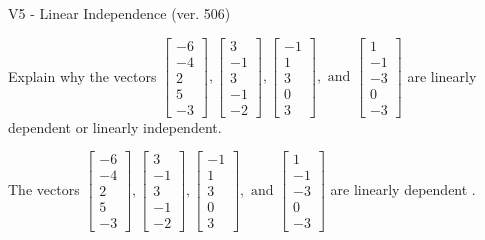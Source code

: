 \begin{exercise}
  \begin{exerciseTitle}V5 - Linear Independence (ver. 506)\end{exerciseTitle}
  \begin{exerciseStatement}
    Explain why the vectors \(\left[\begin{array}{r}
-6 \\
-4 \\
2 \\
5 \\
-3
\end{array}\right] , \left[\begin{array}{r}
3 \\
-1 \\
3 \\
-1 \\
-2
\end{array}\right] , \left[\begin{array}{r}
-1 \\
1 \\
3 \\
0 \\
3
\end{array}\right] , \text{ and } \left[\begin{array}{r}
1 \\
-1 \\
-3 \\
0 \\
-3
\end{array}\right]\) are linearly dependent or linearly independent.	


  \end{exerciseStatement}
  \begin{exerciseAnswer}
   The vectors \(\left[\begin{array}{r}
-6 \\
-4 \\
2 \\
5 \\
-3
\end{array}\right] , \left[\begin{array}{r}
3 \\
-1 \\
3 \\
-1 \\
-2
\end{array}\right] , \left[\begin{array}{r}
-1 \\
1 \\
3 \\
0 \\
3
\end{array}\right] , \text{ and } \left[\begin{array}{r}
1 \\
-1 \\
-3 \\
0 \\
-3
\end{array}\right]\) are 
  	 linearly dependent  .
  


  \end{exerciseAnswer}
\end{exercise}